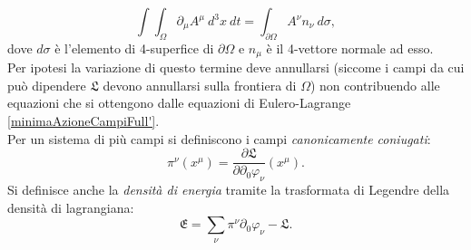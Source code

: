 \begin{equation*}
    \int\int_{\Omega}\partial_\mu A^\mu \ d^3x\ dt=\int_{\partial\Omega} A^\nu n_\nu\ d\sigma,
\end{equation*}
dove $d\sigma$ è l'elemento di 4-superfice di $\partial\Omega$ e $n_\mu$ è il 4-vettore normale ad esso.\\ Per ipotesi la variazione di questo termine deve annullarsi (siccome i campi da cui può dipendere $\mathfrak{L}$ devono annullarsi sulla frontiera di $\Omega$) non contribuendo alle equazioni che si ottengono dalle equazioni di Eulero-Lagrange \eqref{minimaAzioneCampiFull'}.\\

Per un sistema di più campi si definiscono i campi \emph{canonicamente coniugati}:
\begin{equation}
    \pi^\nu(x^\mu)=\frac{\partial \mathfrak{L}}{\partial\partial_{0}\varphi_\nu}(x^\mu)\label{campo coniugato}.
\end{equation}
Si definisce anche la \emph{densità di energia} tramite la trasformata di Legendre della densità di lagrangiana:
\begin{equation}
    \mathfrak{E} =\sum_{\nu}\pi^\nu\partial_0\varphi_\nu-\mathfrak{L} \label{densktà di energia}.
\end{equation}
